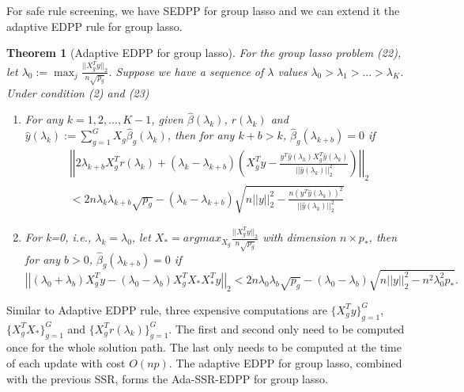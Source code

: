 \documentclass{article}
\newtheorem{theorem}{Theorem}[section]
\begin{document}
For safe rule screening, we have SEDPP for group lasso\citep{wang2013lasso} and we can extend it the adaptive EDPP rule for group lasso.

\begin{theorem}[Adaptive EDPP for group lasso]
For the group lasso problem (22), let $\lambda_0:=\max_j\frac{||X_g^Ty||_2}{n\sqrt{p_g}}$. Suppose we have a sequence of $\lambda$ values $\lambda_0>\lambda_1>...>\lambda_K$. Under condition (2) and (23)
    \begin{enumerate}
        \item For any $k=1,2,...,K-1$, given $\hat{\beta}(\lambda_k)$, $r(\lambda_k)$ and $\hat{y}(\lambda_k):=\sum_{g=1}^GX_g\hat{\beta}_g(\lambda_k)$, then for any  $k+b>k$, $\hat{\beta}_g(\lambda_{k+b})=0$ if
        \begin{equation}
            \begin{split}
                &\left|\left|2\lambda_{k+b}X_g^Tr(\lambda_k)+(\lambda_k-\lambda_{k+b})\left( X_g^Ty-\frac{y^T\hat{y}(\lambda_k)X_g^T\hat{y}(\lambda_k)}{||\hat{y}(\lambda_k)||_2^2}\right)\right|\right|_2\\
                &<2n\lambda_k\lambda_{k+b}\sqrt{p_g}-(\lambda_k-\lambda_{k+b})\sqrt{n||y||_2^2-\frac{n(y^T\hat{y}(\lambda_k))^2}{||\hat{y}(\lambda_k)||_2^2}}
            \end{split}
        \end{equation}
        \item For k=0, i.e., $\lambda_k=\lambda_0$, let $X_*=argmax_{X_g}\frac{||X_g^Ty||_2}{n\sqrt{p_g}}$ with dimension $n\times p_*$, then for any $b>0$, $\hat{\beta}_g(\lambda_{k+b})=0$ if
        \begin{equation}
        \left|\left|(\lambda_0+\lambda_b)X_g^Ty-(\lambda_0-\lambda_b)X_g^TX_*X_*^Ty\right|\right|_2<2n\lambda_0\lambda_b\sqrt{p_g}-(\lambda_0-\lambda_b)\sqrt{n||y||_2^2-n^2\lambda_0^2p_*}.
    \end{equation}
    \end{enumerate}
\end{theorem}

Similar to Adaptive EDPP rule, three expensive computations are $\{X_g^Ty\}_{g=1}^G$, $\{X_g^TX_*\}_{g=1}^G$ and $\{X_g^Tr(\lambda_k)\}_{g=1}^G$. The first and second only need to be computed once for the whole solution path. The last only needs to be computed at the time of each update with cost $O(np)$. The adaptive EDPP for group lasso, combined with the previous SSR, forms the Ada-SSR-EDPP for group lasso.
\end{document}
